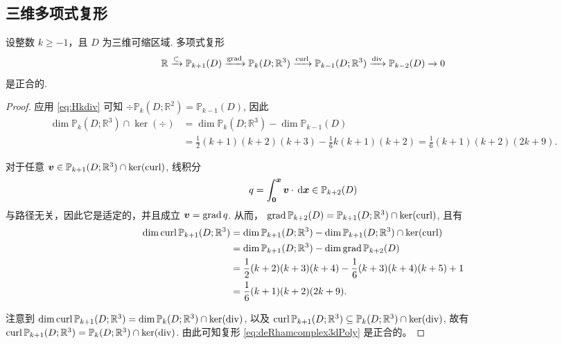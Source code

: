 \subsection{三维多项式复形}


\begin{lemma}
设整数 $k\geq-1$，且 $D$ 为三维可缩区域.
多项式复形
\begin{equation}\label{eq:deRhamcomplex3dPoly}
\mathbb R\xrightarrow{\subset} \mathbb P_{k+1}(D)\xrightarrow{\operatorname{grad}} \mathbb P_{k}(D;\mathbb R^3)\xrightarrow{\operatorname{curl}}\mathbb P_{k-1}(D;\mathbb R^3) \xrightarrow{\operatorname{div}} \mathbb P_{k-2}(D)\xrightarrow{}0
\end{equation}
是正合的.  
\end{lemma}
\begin{proof}
应用 \eqref{eq:Hkdiv} 可知 $\div\mathbb P_k(D;\mathbb R^2) = \mathbb P_{k-1}(D)$, 因此
\begin{align*}
\dim\mathbb P_k(D;\mathbb R^3)\cap\ker(\div)&=\dim \mathbb P_k(D; \mathbb R^3)-\dim \mathbb P_{k-1}(D) \\
&=\frac{1}{2}(k+1)(k+2)(k+3)-\frac{1}{6}k(k+1)(k+2)=\frac{1}{6}(k+1)(k+2)(2k+9).
\end{align*}

对于任意 $\boldsymbol v\in\mathbb P_{k+1}(D; \mathbb R^3)\cap\ker(\operatorname{curl})$, 线积分
\[
q=\int_{\boldsymbol 0}^{\boldsymbol x}\boldsymbol v\cdot\,{\rm d}\boldsymbol x \in \mathbb P_{k+2}(D)
\]
与路径无关，因此它是适定的，并且成立 $\boldsymbol v=\operatorname{grad} q$. 从而， $\operatorname{grad}\mathbb P_{k+2}(D)=\mathbb P_{k+1}(D; \mathbb R^3)\cap\ker(\operatorname{curl})$, 且有
\begin{align*}
\dim\operatorname{curl}\mathbb P_{k+1}(D; \mathbb R^3)&=\dim \mathbb P_{k+1}(D; \mathbb R^3)-\dim \mathbb P_{k+1}(D; \mathbb R^3)\cap\ker(\operatorname{curl}) \\
&=\dim \mathbb P_{k+1}(D; \mathbb R^3)-\dim\operatorname{grad}\mathbb P_{k+2}(D) \\
&=\frac{1}{2}(k+2)(k+3)(k+4)-\frac{1}{6}(k+3)(k+4)(k+5)+1 \\
&=\frac{1}{6}(k+1)(k+2)(2k+9).
\end{align*}

注意到 $\dim\operatorname{curl}\mathbb P_{k+1}(D; \mathbb R^3)=\dim\mathbb P_k(D;\mathbb R^3)\cap\ker(\operatorname{div})$, 以及 $\operatorname{curl}\mathbb P_{k+1}(D; \mathbb R^3)\subseteq\mathbb P_k(D;\mathbb R^3)\cap\ker(\operatorname{div})$, 故有 $\operatorname{curl}\mathbb P_{k+1}(D; \mathbb R^3)=\mathbb P_k(D;\mathbb R^3)\cap\ker(\operatorname{div})$.
由此可知复形 \eqref{eq:deRhamcomplex3dPoly} 是正合的。
\end{proof}

%



